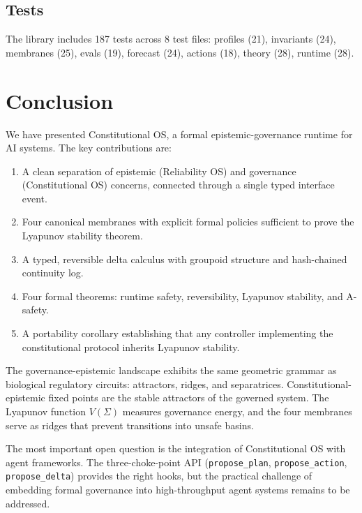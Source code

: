 \documentclass[11pt]{article}
\begin{document}
\subsection{Tests}

The library includes 187 tests across 8 test files:
profiles (21), invariants (24), membranes (25), evals (19),
forecast (24), actions (18), theory (28), runtime (28).

\section{Conclusion}
\label{sec:conclusion}

We have presented Constitutional OS, a formal epistemic-governance
runtime for AI systems. The key contributions are:

\begin{enumerate}
  \item A clean separation of epistemic (Reliability OS) and
    governance (Constitutional OS) concerns, connected through
    a single typed interface event.
  \item Four canonical membranes with explicit formal policies
    sufficient to prove the Lyapunov stability theorem.
  \item A typed, reversible delta calculus with groupoid structure
    and hash-chained continuity log.
  \item Four formal theorems: runtime safety, reversibility,
    Lyapunov stability, and A-safety.
  \item A portability corollary establishing that any controller
    implementing the constitutional protocol inherits
    Lyapunov stability.
\end{enumerate}

The governance-epistemic landscape exhibits the same geometric
grammar as biological regulatory circuits: attractors, ridges,
and separatrices. Constitutional-epistemic fixed points are the
stable attractors of the governed system. The Lyapunov function
$V(\Sigma)$ measures governance energy, and the four membranes
serve as ridges that prevent transitions into unsafe basins.

The most important open question is the integration of
Constitutional OS with agent frameworks. The three-choke-point
API (\texttt{propose\_plan}, \texttt{propose\_action},
\texttt{propose\_delta}) provides the right hooks, but the
practical challenge of embedding formal governance into
high-throughput agent systems remains to be addressed.



\end{document}
